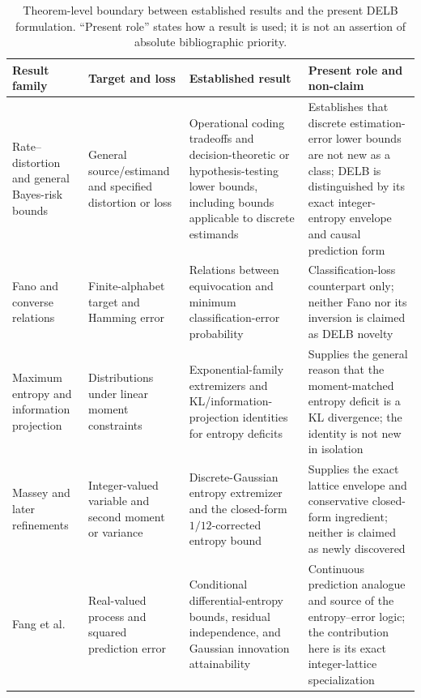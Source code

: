 \begin{table}[!t]
\caption{Theorem-level boundary between established results and the present
DELB formulation. ``Present role'' states how a result is used; it is not an
assertion of absolute bibliographic priority.}
\label{tab:prior_bound_matrix}
\centering
\scriptsize
\setlength{\tabcolsep}{3pt}
\begin{tabularx}{\textwidth}{
    >{\RaggedRight\arraybackslash}p{}
    >{\RaggedRight\arraybackslash}p{}
    >{\RaggedRight\arraybackslash}p{}
    >{\RaggedRight\arraybackslash}X}
\toprule
\textbf{Result family} & \textbf{Target and loss} &
\textbf{Established result} & \textbf{Present role and non-claim}\\
\midrule
Rate--distortion and general Bayes-risk bounds
\citep{shannon_rate_distortion,chen_bayes_risk,jeong_ziv_zakai}
& General source/estimand and specified distortion or loss
& Operational coding tradeoffs and decision-theoretic or
hypothesis-testing lower bounds, including bounds applicable to discrete
estimands
& Establishes that discrete estimation-error lower bounds are not new as a
class; DELB is distinguished by its exact integer-entropy envelope and
causal prediction form\\

Fano and converse relations
\citep{cover_thomas,feder_merhav}
& Finite-alphabet target and Hamming error
& Relations between equivocation and minimum classification-error
probability
& Classification-loss counterpart only; neither Fano nor its inversion is
claimed as DELB novelty\\

Maximum entropy and information projection
\citep{csiszar_iprojection,cover_thomas}
& Distributions under linear moment constraints
& Exponential-family extremizers and KL/information-projection identities
for entropy deficits
& Supplies the general reason that the moment-matched entropy deficit is a
KL divergence; the identity is not new in isolation\\

Massey and later refinements
\citep{massey_integer_entropy,rioul_massey}
& Integer-valued variable and second moment or variance
& Discrete-Gaussian entropy extremizer and the closed-form
\(1/12\)-corrected entropy bound
& Supplies the exact lattice envelope and conservative closed-form
ingredient; neither is claimed as newly discovered\\

Fang et al.\ \citep{fang_variance_bounds}
& Real-valued process and squared prediction error
& Conditional differential-entropy bounds, residual independence, and
Gaussian innovation attainability
& Continuous prediction analogue and source of the entropy--error logic;
the contribution here is its exact integer-lattice specialization\\


\end{tabularx}
\end{table}
